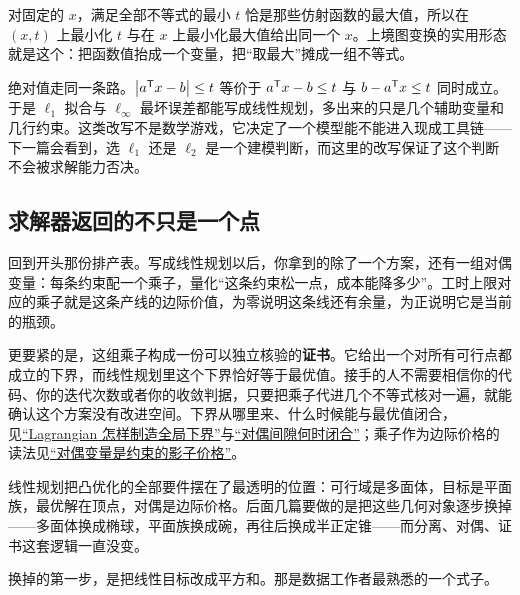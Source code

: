 对固定的 \(x\)，满足全部不等式的最小 \(t\) 恰是那些仿射函数的最大值，所以在 \((x,t)\) 上最小化 \(t\) 与在 \(x\) 上最小化最大值给出同一个 \(x\)。上境图变换的实用形态就是这个：把函数值抬成一个变量，把``取最大''摊成一组不等式。

绝对值走同一条路。\(\left|a^{\mathsf{T}}x-b\right|\le t\) 等价于 \(a^{\mathsf{T}}x-b\le t\) 与 \(b-a^{\mathsf{T}}x\le t\) 同时成立。于是 \(\ell_1\) 拟合与 \(\ell_\infty\) 最坏误差都能写成线性规划，多出来的只是几个辅助变量和几行约束。这类改写不是数学游戏，它决定了一个模型能不能进入现成工具链——下一篇会看到，选 \(\ell_1\) 还是 \(\ell_2\) 是一个建模判断，而这里的改写保证了这个判断不会被求解能力否决。

\subsection{求解器返回的不只是一个点}

回到开头那份排产表。写成线性规划以后，你拿到的除了一个方案，还有一组对偶变量：每条约束配一个乘子，量化``这条约束松一点，成本能降多少''。工时上限对应的乘子就是这条产线的边际价值，为零说明这条线还有余量，为正说明它是当前的瓶颈。

更要紧的是，这组乘子构成一份可以独立核验的\textbf{证书}。它给出一个对所有可行点都成立的下界，而线性规划里这个下界恰好等于最优值。接手的人不需要相信你的代码、你的迭代次数或者你的收敛判据，只要把乘子代进几个不等式核对一遍，就能确认这个方案没有改进空间。下界从哪里来、什么时候能与最优值闭合，见\hyperref[sec:09-Convex-Optimization/05-Duality/01]{``Lagrangian 怎样制造全局下界''}与\hyperref[sec:09-Convex-Optimization/05-Duality/02]{``对偶间隙何时闭合''}；乘子作为边际价格的读法见\hyperref[sec:09-Convex-Optimization/05-Duality/04]{``对偶变量是约束的影子价格''}。

线性规划把凸优化的全部要件摆在了最透明的位置：可行域是多面体，目标是平面族，最优解在顶点，对偶是边际价格。后面几篇要做的是把这些几何对象逐步换掉——多面体换成椭球，平面族换成碗，再往后换成半正定锥——而分离、对偶、证书这套逻辑一直没变。

换掉的第一步，是把线性目标改成平方和。那是数据工作者最熟悉的一个式子。

